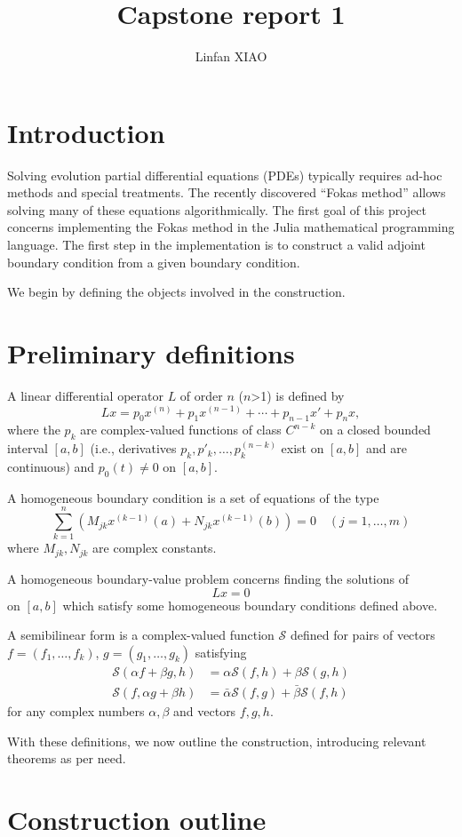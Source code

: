 \documentclass[11pt, oneside, a4paper]{article}
\author{Linfan XIAO}
\title{Capstone report 1}
\date{\vspace{-5ex}}
\begin{document}
\maketitle

\thispagestyle{fancy}


\section{Introduction}
Solving evolution partial differential equations (PDEs) typically requires ad-hoc methods and special treatments. The recently discovered ``Fokas method''\cite{Kesici2016} allows solving many of these equations algorithmically. The first goal of this project concerns implementing the Fokas method in the Julia mathematical programming language. The first step in the implementation is to construct a valid adjoint boundary condition from a given boundary condition.

We begin by defining the objects involved in the construction.

\section{Preliminary definitions\cite{CoddingtonLevinson}}
A linear differential operator $L$ of order $n$ ($n$>1) is defined by
\[Lx = p_0x^{(n)} + p_1x^{(n-1)} + \cdots + p_{n-1}x' + p_nx,\]
where the $p_k$ are complex-valued functions of class $C^{n-k}$ on a closed bounded interval $[a,b]$ (i.e., derivatives $p_k, p'_k, \ldots, p^{(n-k)}_k$ exist on $[a,b]$ and are continuous) and $p_0(t)\neq 0$ on $[a,b]$.

A homogeneous boundary condition is a set of equations of the type
\begin{equation}\label{eq:homogeneous boundary conditions}
    \sum_{k=1}^n (M_{jk}x^{(k-1)}(a) + N_{jk}x^{(k-1)}(b))=0 \quad (j=1,\ldots,m) 
\end{equation}
where $M_{jk}, N_{jk}$ are complex constants.

A homogeneous boundary-value problem concerns finding the solutions of 
\[Lx=0\] on $[a,b]$ which satisfy some homogeneous boundary conditions defined above.

A semibilinear form is a complex-valued function $\mathcal{S}$ defined for pairs of vectors $f=(f_1,\ldots,f_k)$, $g=(g_1,\ldots,g_k)$ satisfying
\begin{align*}
    \mathcal{S}(\alpha f+\beta g, h)&=\alpha\mathcal{S}(f,h) + \beta\mathcal{S}(g,h)\\
    \mathcal{S}(f, \alpha g + \beta h) &= \bar{\alpha}\mathcal{S}(f,g) + \bar{\beta}\mathcal{S}(f, h)
\end{align*}
for any complex numbers $\alpha, \beta$ and vectors $f,g,h$.

With these definitions, we now outline the construction, introducing relevant theorems as per need.

\section{Construction outline}

\newpage


\end{document}
